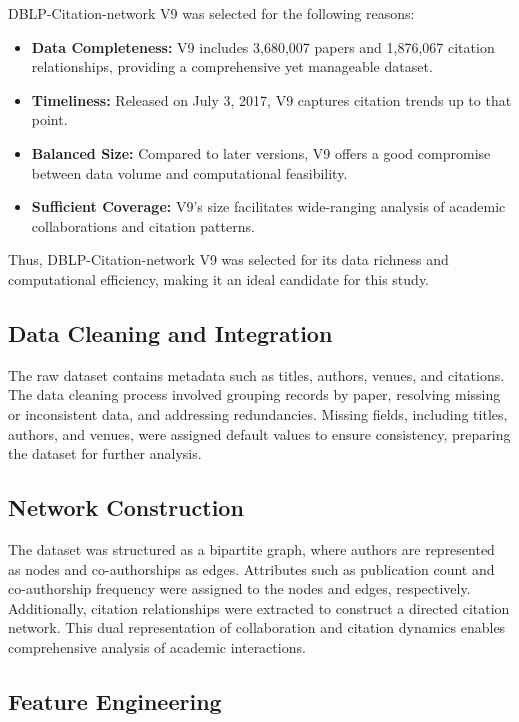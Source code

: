\documentclass[11pt]{article}
\begin{document}
DBLP-Citation-network V9 was selected for the following reasons:

\begin{itemize}
	\item \textbf{Data Completeness:} V9 includes 3,680,007 papers and 1,876,067 citation relationships, providing a comprehensive yet manageable dataset.
	\item \textbf{Timeliness:} Released on July 3, 2017, V9 captures citation trends up to that point.
	\item \textbf{Balanced Size:} Compared to later versions, V9 offers a good compromise between data volume and computational feasibility.
	\item \textbf{Sufficient Coverage:} V9’s size facilitates wide-ranging analysis of academic collaborations and citation patterns.
\end{itemize}

Thus, DBLP-Citation-network V9 was selected for its data richness and computational efficiency, making it an ideal candidate for this study.

\subsection{Data Cleaning and Integration}

The raw dataset contains metadata such as titles, authors, venues, and citations. The data cleaning process involved grouping records by paper, resolving missing or inconsistent data, and addressing redundancies. Missing fields, including titles, authors, and venues, were assigned default values to ensure consistency, preparing the dataset for further analysis.

\subsection{Network Construction}

The dataset was structured as a bipartite graph, where authors are represented as nodes and co-authorships as edges. Attributes such as publication count and co-authorship frequency were assigned to the nodes and edges, respectively. Additionally, citation relationships were extracted to construct a directed citation network. This dual representation of collaboration and citation dynamics enables comprehensive analysis of academic interactions.

\subsection{Feature Engineering}
\end{document}
